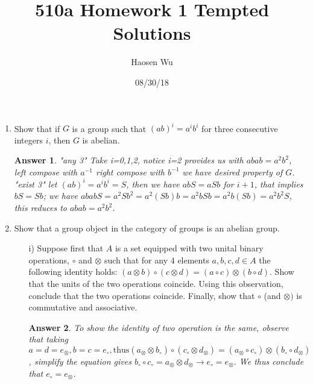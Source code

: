 \documentclass[11pt,leqno]{article}
\newcommand{\tensor}{\otimes}
\newcommand{\<}[1]{{\langle}#1 {\rangle}}
\theoremstyle{plain}
\newtheorem*{answer*}{Answer}
\theoremstyle{definition}
\theoremstyle{remark}
\numberwithin{equation}{section}
\begin{document}
\pagestyle{fancy}
\renewcommand{\sectionmark}[1]{\markright{\thesection\ #1}}
\fancyhead{}
\fancyhead[LO,R]{\bfseries\footnotesize\thepage}
\fancyhead[LE]{\bfseries\footnotesize\rightmark}
\fancyhead[RO]{\bfseries\footnotesize\rightmark}
\chead[]{}
\cfoot[]{}
\setlength{\headheight}{1cm}


\author{Haosen Wu}
\title{{\bf 510a Homework 1 Tempted Solutions}}
\date{08/30/18}


\maketitle
\begin{enumerate}

\item Show that if $G$ is a group such that $(ab)^i = a^ib^i$ for three consecutive integers $i$, then $G$ is abelian.
    \begin{answer*}
    "any 3" Take i={0,1,2}, notice i=2 provides us with $abab=a^2b^2$, left compose with $a^{-1}$ right compose with $b^{-1}$ we have desired property of $G$.\\
    "exist 3" let $(ab)^i=a^ib^i=S$, then we have $abS=aSb$ for $i+1$, that implies $bS=Sb$; we have $ababS=a^2Sb^2=a^2(Sb)b=a^2bSb=a^2b(Sb)=a^2b^2S$, this reduces to $abab=a^2b^2$.
    \end{answer*}

    
\item Show that a group object in the category of groups is an abelian group.
\begin{itemize}
\item[i)]  Suppose first that $A$ is a set equipped with two unital binary operations, $\circ$ and $\tensor$ such that for any $4$ elements $a,b,c,d \in A$ the following identity holds: $(a \tensor b) \circ (c \tensor d) = (a \circ c) \tensor (b \circ d)$.  Show that the units of the two operations coincide.  Using this observation, conclude that the two operations coincide.  Finally, show that $\circ$ (and $\tensor)$ is commutative and associative.
    \begin{answer*}
    To show the identity of two operation is the same, observe that taking $a=d=e_\otimes, b=c=e_\circ, \textrm{thus} (a_\otimes \otimes b_\circ) \circ (c_\circ \otimes d_\otimes) = (a_\otimes \circ c_\circ) \otimes (b_\circ \circ d_\otimes)$, simplify the equation gives $b_\circ \circ c_\circ = a_\otimes \otimes  d_\otimes \rightarrow e_\circ = e_\otimes $. We thus conclude that $e_\circ = e_\otimes$.
    

\end{answer*}
\end{itemize}
\end{enumerate}
\end{document}
